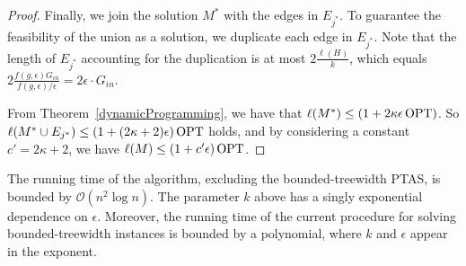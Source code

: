 \begin{proof}
    Finally, we join the solution \(M^\ast\) with the edges in \(E_{j^\ast}\). To guarantee the feasibility of the union as a solution, we duplicate each edge in \(E_{j^\ast}\). Note that the length of \(E_{j^\ast}\) accounting for the duplication is at most \(2 \frac{\ell(H)}{k}\), which equals \(2 \frac{f(g, \epsilon) G_{in}}{f(g, \epsilon) / \epsilon} = 2 \epsilon \cdot G_{in}\).

    From Theorem~\ref{dynamicProgramming}, we have that \(\ell(M^\ast) \leq (1 + 2 \kappa \epsilon \operatorname{\textrm{OPT}})\). So \(\ell(M^\ast \cup E_{j^\ast}) \leq (1 + (2 \kappa + 2) \epsilon) \operatorname{\textrm{OPT}}\) holds, and by considering a constant \(c' = 2 \kappa + 2\), we have \(\ell(M) \leq (1 + c' \epsilon) \operatorname{\textrm{OPT}}\).

\end{proof}

The running time of the algorithm, excluding the bounded-treewidth PTAS, is bounded by \(\mathcal{O}(n^2 \log n)\). The parameter \(k\) above has a singly exponential dependence on \(\epsilon\). Moreover, the running time of the current procedure for solving bounded-treewidth instances is bounded by a polynomial, where \(k\) and \(\epsilon\) appear in the exponent.
